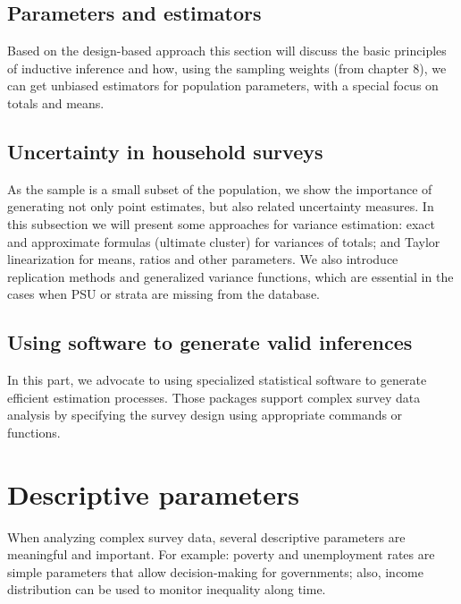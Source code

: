 \documentclass[
  12pt,
]{book}
\begin{document}
\hypertarget{parameters-and-estimators}{%
\section{Parameters and estimators}\label{parameters-and-estimators}}

Based on the design-based approach this section will discuss the basic principles of inductive inference and how, using the sampling weights (from chapter 8), we can get unbiased estimators for population parameters, with a special focus on totals and means.

\hypertarget{uncertainty-in-household-surveys}{%
\section{Uncertainty in household surveys}\label{uncertainty-in-household-surveys}}

As the sample is a small subset of the population, we show the importance of generating not only point estimates, but also related uncertainty measures. In this subsection we will present some approaches for variance estimation: exact and approximate formulas (ultimate cluster) for variances of totals; and Taylor linearization for means, ratios and other parameters. We also introduce replication methods and generalized variance functions, which are essential in the cases when PSU or strata are missing from the database.

\hypertarget{using-software-to-generate-valid-inferences}{%
\section{Using software to generate valid inferences}\label{using-software-to-generate-valid-inferences}}

In this part, we advocate to using specialized statistical software to generate efficient estimation processes. Those packages support complex survey data analysis by specifying the survey design using appropriate commands or functions.

\hypertarget{descriptive-parameters}{%
\chapter{Descriptive parameters}\label{descriptive-parameters}}

When analyzing complex survey data, several descriptive parameters are meaningful and important. For example: poverty and unemployment rates are simple parameters that allow decision-making for governments; also, income distribution can be used to monitor inequality along time.
\end{document}
